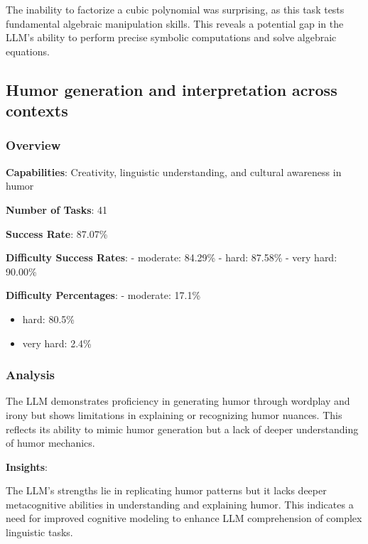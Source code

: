 \documentclass[fleqn,10pt]{wlscirep}
\begin{document}
The inability to factorize a cubic polynomial was surprising, as this
task tests fundamental algebraic manipulation skills. This reveals a
potential gap in the LLM's ability to perform precise symbolic
computations and solve algebraic equations.

\hypertarget{humor-generation-and-interpretation-across-contexts}{%
\subsection{Humor generation and interpretation across
contexts}\label{humor-generation-and-interpretation-across-contexts}}

\hypertarget{overview-22}{%
\subsubsection{Overview}\label{overview-22}}

\textbf{Capabilities}: Creativity, linguistic understanding, and
cultural awareness in humor

\textbf{Number of Tasks}: 41

\textbf{Success Rate}: 87.07\%

\textbf{Difficulty Success Rates}: - moderate: 84.29\% - hard: 87.58\% -
very hard: 90.00\%

\textbf{Difficulty Percentages}: - moderate: 17.1\%

\begin{itemize}
\item
  hard: 80.5\%
\item
  very hard: 2.4\%
\end{itemize}

\hypertarget{analysis-20}{%
\subsubsection{Analysis}\label{analysis-20}}

The LLM demonstrates proficiency in generating humor through wordplay
and irony but shows limitations in explaining or recognizing humor
nuances. This reflects its ability to mimic humor generation but a lack
of deeper understanding of humor mechanics.

\textbf{Insights}:

The LLM's strengths lie in replicating humor patterns but it lacks
deeper metacognitive abilities in understanding and explaining humor.
This indicates a need for improved cognitive modeling to enhance LLM
comprehension of complex linguistic tasks.
\end{document}
